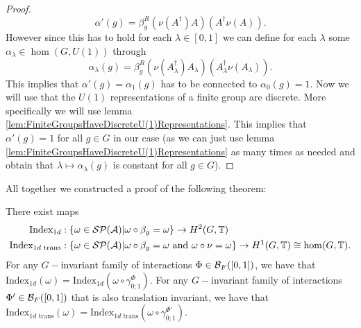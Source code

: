 \documentclass[11pt,a4paper,twoside]{article}
\numberwithin{equation}{section}
\begin{document}
\begin{proof}
\begin{equation}
			\alpha'(g)=\beta_g^R(\nu(A^\dagger)A)(A^\dagger \nu(A)).
		\end{equation}
		However since this has to hold for each $\lambda\in[0,1]$ we can define for each $\lambda$ some $\alpha_\lambda\in\hom(G,U(1))$ through
		\begin{equation}
			\alpha_\lambda(g)=\beta_g^R(\nu(A^\dagger_\lambda)A_\lambda)(A^\dagger_\lambda \nu(A_\lambda)).
		\end{equation}
		This implies that $\alpha'(g)=\alpha_1(g)$ has to be connected to $\alpha_0(g)=1$. Now we will use that the $U(1)$ representations of a finite group are discrete. More specifically we will use lemma \ref{lem:FiniteGroupsHaveDiscreteU(1)Representations}. This implies that $\alpha'(g)=1$ for all $g\in G$ in our case (as we can just use lemma \ref{lem:FiniteGroupsHaveDiscreteU(1)Representations} as many times as needed and obtain that $\lambda\mapsto\alpha_\lambda(g)$ is constant for all $g\in G$).
	\end{proof}
	All together we constructed a proof of the following theorem:
	\begin{theorem}
		There exist maps
		\begin{align}
			\textrm{Index}_{1d}&:\{\omega\in\mathcal{S}\mathcal P(\mathcal A)|\omega\circ\beta_g=\omega\}\rightarrow H^2(G,\mathbb T)\\
			\textrm{Index}_{1d\text{ trans}}&:\{\omega\in\mathcal{S}\mathcal P(\mathcal A)|\omega\circ\beta_g=\omega\text{ and }\omega\circ\nu=\omega\}\rightarrow H^1(G,\mathbb T)\cong \hom(G,\mathbb T).
		\end{align}
		For any $G-$invariant family of interactions $\Phi\in\mathcal B_{F}([0,1])$, we have that $\textrm{Index}_{1d}(\omega)=\textrm{Index}_{1d}(\omega\circ\gamma^\Phi_{0;1})$. For any $G-$invariant family of interactions $\Phi'\in\mathcal B_{F}([0,1])$ that is also translation invariant, we have that $\textrm{Index}_{1d\text{ trans}}(\omega)=\textrm{Index}_{1d\text{ trans}}(\omega\circ\gamma^{\Phi'}_{0;1})$.
	\end{theorem}
\end{document}
